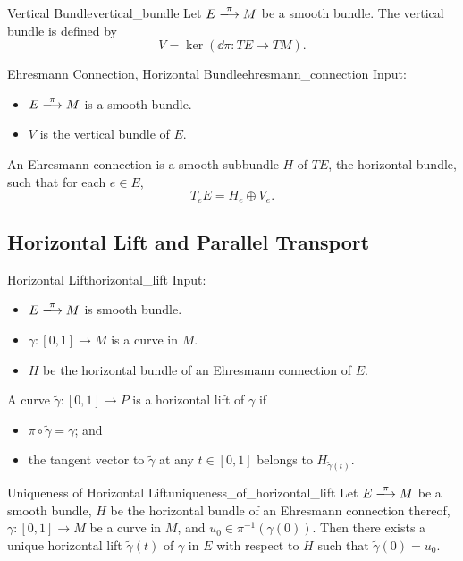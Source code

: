 \documentclass{article}
\begin{document}
\begin{definition}{Vertical Bundle}{vertical_bundle}
    Let $E \xlongrightarrow{\pi} M$ be a smooth bundle.
    The vertical bundle is defined by
    \[ V = \ker(\dd{\pi}: TE \rightarrow TM). \]
\end{definition}

\begin{definition}{Ehresmann Connection, Horizontal Bundle}{ehresmann_connection}
    Input:
    \begin{itemize}
        \item $E \xlongrightarrow{\pi} M$ is a smooth bundle.
        \item $V$ is the vertical bundle of $E$.
    \end{itemize}
    An Ehresmann connection is a smooth subbundle $H$ of $TE$, the horizontal bundle, such that for each $e\in E$,
    \[ T_eE = H_e \oplus V_e. \]
\end{definition}

\subsection{Horizontal Lift and Parallel Transport}

\begin{definition}{Horizontal Lift}{horizontal_lift}
    Input:
    \begin{itemize}
        \item $E\xlongrightarrow{\pi} M$ is smooth bundle.
        \item $\gamma: [0,1] \rightarrow M$ is a curve in $M$.
        \item $H$ be the horizontal bundle of an Ehresmann connection of $E$.
    \end{itemize}
    A curve $\tilde{\gamma}: [0,1] \rightarrow P$ is a horizontal lift of $\gamma$ if
    \begin{itemize}
        \item $\pi\circ \tilde{\gamma} = \gamma$; and
        \item the tangent vector to $\tilde{\gamma}$ at any $t\in [0,1]$ belongs to $H_{\tilde{\gamma}(t)}$.
    \end{itemize}
\end{definition}

\begin{theorem}{Uniqueness of Horizontal Lift}{uniqueness_of_horizontal_lift}
    Let $E\xlongrightarrow{\pi} M$ be a smooth bundle,
    $H$ be the horizontal bundle of an Ehresmann connection thereof,
    $\gamma: [0,1]\rightarrow M$ be a curve in $M$,
    and $u_0\in \pi^{-1}(\gamma(0))$.
    Then there exists a unique horizontal lift $\tilde{\gamma}(t)$ of $\gamma$ in $E$ with respect to $H$ such that $\tilde{\gamma}(0) = u_0$.
\end{theorem}
\end{document}
